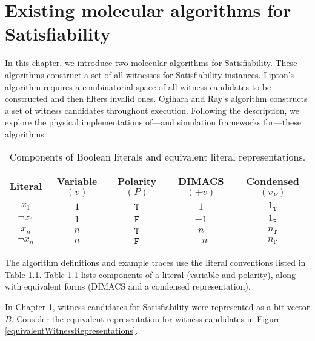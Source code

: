 \chapter{Existing molecular algorithms for {\sc Satisfiability}}


In this chapter, we introduce two molecular algorithms for {\sc Satisfiability}.  These algorithms construct a set of all witnesses for {\sc Satisfiability} instances.  Lipton's algorithm requires a combinatorial space of all witness candidates to be constructed and then filters invalid ones.  Ogihara and Ray's algorithm constructs a set of witness candidates throughout execution.  Following the description, we explore the physical implementations of---and simulation frameworks for---these algorithms.

\begin{table}[htdp]
\caption{Components of Boolean literals and equivalent literal representations.}
\begin{center}
\begin{tabular}{| c | c | c | c | c |}
\hline
\textbf{Literal} & \textbf{Variable} $(v)$ & \textbf{Polarity} $(P)$ & \textbf{DIMACS} $(\pm v)$ & \textbf{Condensed} $(v_P)$ \\ \hline	
$x_1$ & $1$ & $\texttt{T}$ & $1$ & $1_{\texttt{T}}$ \\
$\neg x_1$ & $1$ & $\texttt{F}$ & $-1$ & $1_{\texttt{F}}$ \\
$x_n$ & $n$ & $\texttt{T}$ & $n$ & $n_{\texttt{T}}$ \\
$\neg x_n$ & $n$ & $\texttt{F}$ & $-n$ & $n_{\texttt{F}}$ \\ \hline
\end{tabular}
\end{center}
\label{equivalentLiteralTable}
\end{table}%

The algorithm definitions and example traces use the literal conventions listed in Table \ref{equivalentLiteralTable}.  Table \ref{equivalentLiteralTable} lists components of a literal (variable and polarity), along with equivalent forms (DIMACS and a condensed representation).  

In Chapter 1, witness candidates for {\sc Satisfiability} were represented as a bit-vector $B$.  Consider the equivalent representation for witness candidates in Figure \ref{equivalentWitnessRepresentations}.

